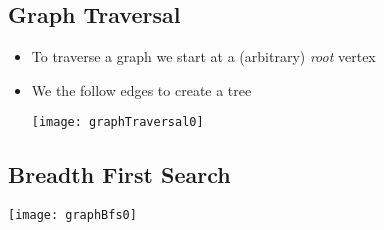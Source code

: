 
\begin{slide}
\section[-2]{Graph Traversal}

\begin{PauseHighLight}
  \pb
  \begin{itemize}
  \item To traverse a graph we start at a (arbitrary) \textit{root}
    vertex\pauseh
  \item We the follow edges to create a tree\pauseh
\begin{center}
  \texttt{[image: graphTraversal0]}
  {}
\end{center}

  \end{itemize}
\end{PauseHighLight}

\end{slide}


\begin{slide}
\section[-2]{Breadth First Search}
\pb
\pause
\begin{center}
  \texttt{[image: graphBfs0]}
  {}
\end{center}

\end{slide}


